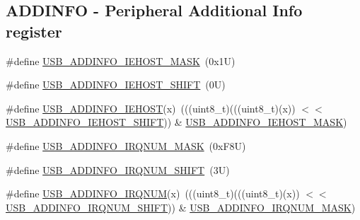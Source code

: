 \subsection*{A\+D\+D\+I\+N\+FO -\/ Peripheral Additional Info register}
\begin{DoxyCompactItemize}
\item 
\#define \mbox{\hyperlink{group___u_s_b___register___masks_gacb7c792034c73c4861bc8fba6ff4314f}{U\+S\+B\+\_\+\+A\+D\+D\+I\+N\+F\+O\+\_\+\+I\+E\+H\+O\+S\+T\+\_\+\+M\+A\+SK}}~(0x1\+U)
\item 
\#define \mbox{\hyperlink{group___u_s_b___register___masks_gad256dcdfe8443877169b69dbcc8a041e}{U\+S\+B\+\_\+\+A\+D\+D\+I\+N\+F\+O\+\_\+\+I\+E\+H\+O\+S\+T\+\_\+\+S\+H\+I\+FT}}~(0\+U)
\item 
\#define \mbox{\hyperlink{group___u_s_b___register___masks_gacdd8ba22b3c767cd5f2b22b79d861660}{U\+S\+B\+\_\+\+A\+D\+D\+I\+N\+F\+O\+\_\+\+I\+E\+H\+O\+ST}}(x)~(((uint8\+\_\+t)(((uint8\+\_\+t)(x)) $<$$<$ \mbox{\hyperlink{group___u_s_b___register___masks_gad256dcdfe8443877169b69dbcc8a041e}{U\+S\+B\+\_\+\+A\+D\+D\+I\+N\+F\+O\+\_\+\+I\+E\+H\+O\+S\+T\+\_\+\+S\+H\+I\+FT}})) \& \mbox{\hyperlink{group___u_s_b___register___masks_gacb7c792034c73c4861bc8fba6ff4314f}{U\+S\+B\+\_\+\+A\+D\+D\+I\+N\+F\+O\+\_\+\+I\+E\+H\+O\+S\+T\+\_\+\+M\+A\+SK}})
\item 
\#define \mbox{\hyperlink{group___u_s_b___register___masks_gaa578584bfaf89e26213e6ba12e5f4b0e}{U\+S\+B\+\_\+\+A\+D\+D\+I\+N\+F\+O\+\_\+\+I\+R\+Q\+N\+U\+M\+\_\+\+M\+A\+SK}}~(0x\+F8\+U)
\item 
\#define \mbox{\hyperlink{group___u_s_b___register___masks_ga3332243caa9e2f9cfc49b031ac54cbda}{U\+S\+B\+\_\+\+A\+D\+D\+I\+N\+F\+O\+\_\+\+I\+R\+Q\+N\+U\+M\+\_\+\+S\+H\+I\+FT}}~(3\+U)
\item 
\#define \mbox{\hyperlink{group___u_s_b___register___masks_ga0ab998135e9b4c5e89fa598b54bf96a3}{U\+S\+B\+\_\+\+A\+D\+D\+I\+N\+F\+O\+\_\+\+I\+R\+Q\+N\+UM}}(x)~(((uint8\+\_\+t)(((uint8\+\_\+t)(x)) $<$$<$ \mbox{\hyperlink{group___u_s_b___register___masks_ga3332243caa9e2f9cfc49b031ac54cbda}{U\+S\+B\+\_\+\+A\+D\+D\+I\+N\+F\+O\+\_\+\+I\+R\+Q\+N\+U\+M\+\_\+\+S\+H\+I\+FT}})) \& \mbox{\hyperlink{group___u_s_b___register___masks_gaa578584bfaf89e26213e6ba12e5f4b0e}{U\+S\+B\+\_\+\+A\+D\+D\+I\+N\+F\+O\+\_\+\+I\+R\+Q\+N\+U\+M\+\_\+\+M\+A\+SK}})
\end{DoxyCompactItemize}
